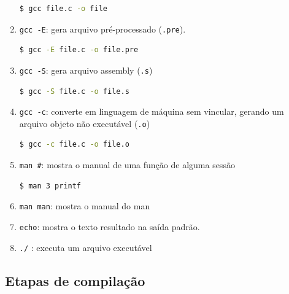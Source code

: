 \begin{enumerate}
        \begin{lstlisting}[language=bash]
            $ gcc file.c -o file
        \end{lstlisting}  
  
\item
  \texttt{gcc\ -E}: gera arquivo pré-processado (\texttt{.pre}).
 
  
        \begin{lstlisting}[language=bash]
            $ gcc -E file.c -o file.pre
        \end{lstlisting}  
\item
  \texttt{gcc\ -S}: gera arquivo assembly (\texttt{.s})


        \begin{lstlisting}[language=bash]
            $ gcc -S file.c -o file.s
        \end{lstlisting}  
  
\item
  \texttt{gcc\ -c}: converte em linguagem de máquina sem vincular,
  gerando um arquivo objeto não executável (\texttt{.o})

        \begin{lstlisting}[language=bash]
            $ gcc -c file.c -o file.o
        \end{lstlisting}    
  
\item
  \texttt{man\ \#}: mostra o manual de uma função de alguma sessão


        \begin{lstlisting}[language=bash]
            $ man 3 printf
        \end{lstlisting}      
  
\item
  \texttt{man\ man}: mostra o manual do man
\item
  \texttt{echo}: mostra o texto resultado na saída padrão.
\item
  \texttt{./} : executa um arquivo executável
\end{enumerate}

\hypertarget{etapas-de-compilauxe7uxe3o}{%
\subsection{Etapas de compilação}\label{etapas-de-compilauxe7uxe3o}}

